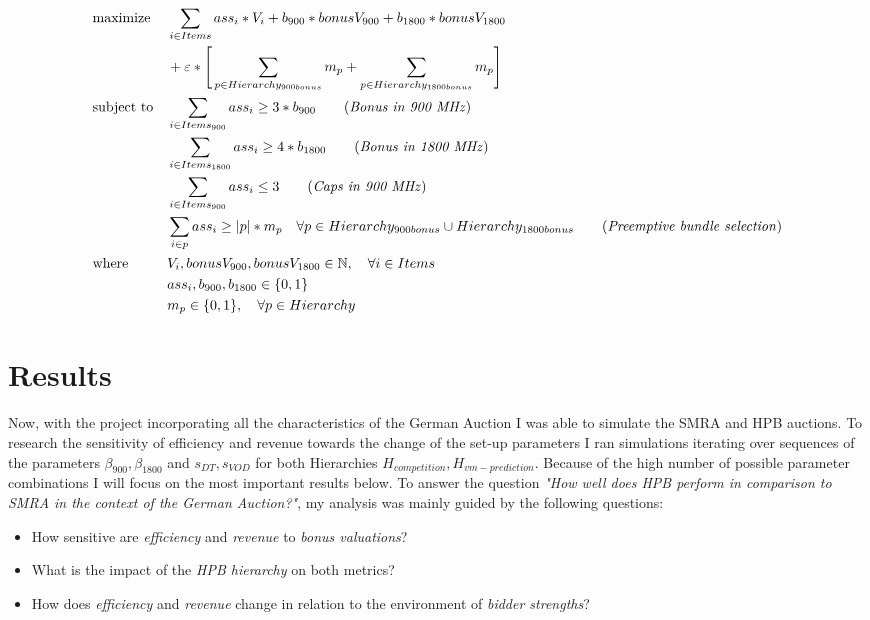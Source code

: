 \begin{align*}
	& {\text{maximize}}
	& & \sum_{i \in Items} ass_{i} * V_{i} + b_{900} * bonusV_{900}  + b_{1800} *bonusV_{1800} \\ 
	& & & + \varepsilon * \Bigg[ \sum_{p \in Hierarchy_{900bonus}} m_p + \sum_{p \in Hierarchy_{1800bonus}} m_p \Bigg] \\
	& \text{subject to}
	& & \sum_{i \in Items_{900}}  ass_{i}  \geq 3 *  b_{900} \tag{\textit{Bonus in 900 MHz}}  \\
	&&& \sum_{i \in Items_{1800}}  ass_{i}  \geq 4 *  b_{1800} \tag{\textit{Bonus in 1800 MHz}} \\
	&&& \sum_{i \in Items_{900}}  ass_{i}  \leq 3 \tag{\textit{Caps in 900 MHz}} \\
	&&& \sum_{i \in p} ass_i \geq |p| * m_p \quad \forall p \in Hierarchy_{900bonus} \cup Hierarchy_{1800bonus} \tag{\textit{Preemptive bundle selection}} \\
	& \text{where}
	& & V_{i}, bonusV_{900}, bonusV_{1800} \in \mathbb{N}, \quad \forall i \in Items \\
	&&& ass_{i}, b_{900}, b_{1800} \in \{0,1\} \\
	&&& m_p \in \{0,1\}, \quad \forall p \in Hierarchy
\end{align*}\label{eq:selector-lp}

\section{Results}
Now, with the project incorporating all the characteristics of the German Auction I was able to simulate the SMRA and HPB auctions. To research the sensitivity of efficiency and revenue towards the change of the set-up parameters I ran simulations iterating over sequences of the parameters $ \beta_{900}, \beta_{1800} $ and $ s_{DT}, s_{VOD} $ for both Hierarchies $ H_{competition}, H_{vm-prediction} $. Because of the high number of possible parameter combinations I will focus on the most important results below. To answer the question \textit{"How well does HPB perform in comparison to SMRA in the context of the German Auction?"}, my analysis was mainly guided by the following questions:

\begin{itemize}
	\item How sensitive are \textit{efficiency} and \textit{revenue} to \textit{bonus valuations}?
	\item What is the impact of the \textit{HPB hierarchy} on both metrics?
	\item How does \textit{efficiency} and \textit{revenue} change in relation to the environment of \textit{bidder strengths}?
\end{itemize}

